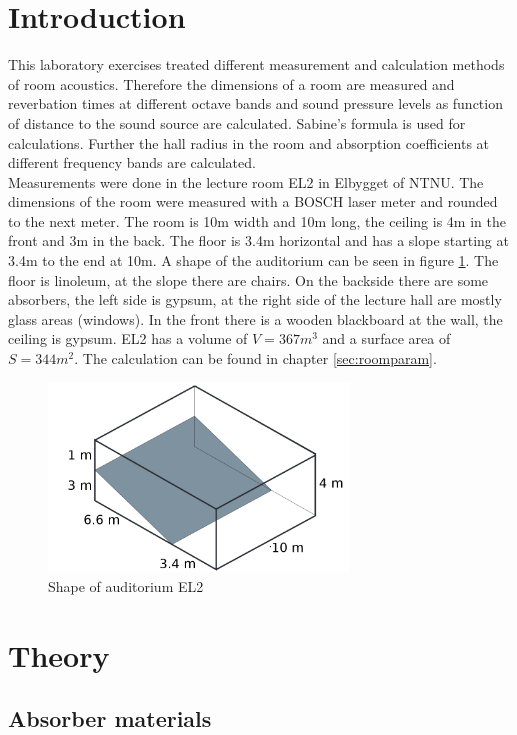 \documentclass{article}
\begin{document}
\section{Introduction}
This laboratory exercises treated different measurement and calculation methods of room acoustics. Therefore the dimensions of a room are measured and reverbation times at different octave bands and sound pressure levels as function of distance to the sound source are calculated. Sabine's formula is used for calculations. Further the hall radius in the room and absorption coefficients at different frequency bands are calculated.\\
Measurements were done in the lecture room EL2 in Elbygget of NTNU. The dimensions of the room were measured with a BOSCH laser meter and rounded to the next meter. The room is 10m width and 10m long, the ceiling is 4m in the front and 3m in the back. The floor is 3.4m horizontal and has a slope starting at 3.4m to the end at 10m. A shape of the auditorium can be seen in figure \ref{fig:shape}. The floor is linoleum, at the slope there are chairs. On the backside there are some absorbers, the left side is gypsum, at the right side of the lecture hall are mostly glass areas (windows). In the front there is a wooden blackboard at the wall, the ceiling is gypsum. EL2 has a volume of $V=367m^3$ and a surface area of $S=344m^2$. The calculation can be found in chapter \ref{sec:roomparam}.
\begin{figure}[htbp]
\begin{center}
\includegraphics[width=8cm,keepaspectratio=true]{roomshape}
\caption{Shape of auditorium EL2}
\label{fig:shape}
\end{center}
\end{figure}
\section{Theory}
\subsection{Absorber materials}
\end{document}
